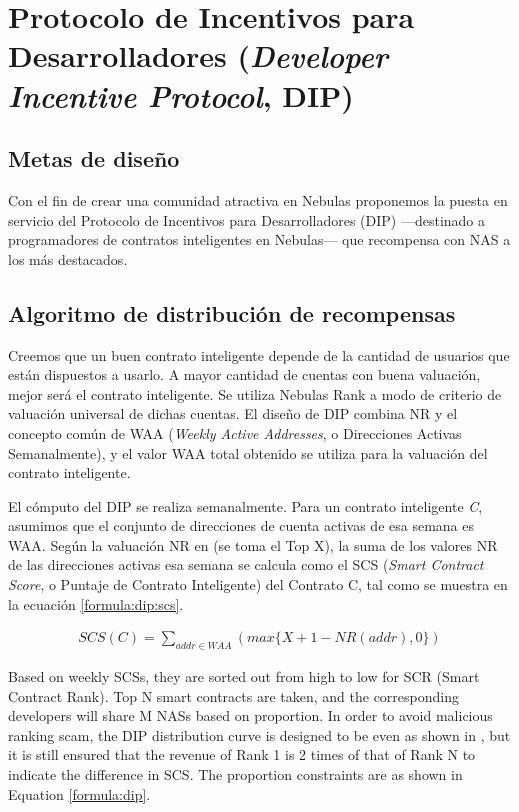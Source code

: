 \section{Protocolo de Incentivos para Desarrolladores (\textit{Developer Incentive Protocol}, DIP)}
\label{sec:dip}

\subsection{Metas de diseño}
\label{dip:design}

Con el fin de crear una comunidad atractiva en Nebulas proponemos la puesta en servicio del Protocolo de Incentivos para Desarrolladores (DIP) —destinado a programadores de contratos inteligentes en Nebulas— que recompensa con NAS a los más destacados.

\subsection{Algoritmo de distribución de recompensas}
\label{dip:arith}

Creemos que un buen contrato inteligente depende de la cantidad de usuarios que están dispuestos a usarlo. A mayor cantidad de cuentas con buena valuación, mejor será el contrato inteligente. Se utiliza Nebulas Rank a modo de criterio de valuación universal de dichas cuentas. El diseño de DIP combina NR y el concepto común de WAA (\textit{Weekly Active Addresses}, o Direcciones Activas Semanalmente), y el valor WAA total obtenido se utiliza para la valuación del contrato inteligente.

El cómputo del DIP se realiza semanalmente. Para un contrato inteligente \textit{C}, asumimos que el conjunto de direcciones de cuenta activas de esa semana es WAA. Según la valuación NR en  (se toma el Top X), la suma de los valores NR de las direcciones activas esa semana se calcula como el SCS (\textit{Smart Contract Score}, o Puntaje de Contrato Inteligente) del Contrato C, tal como se muestra en la ecuación \ref{formula:dip:scs}.

\begin{align}
\label{formula:dip:scs}
SCS(C)=\sum_{addr \in WAA}(max\{X + 1 - NR(addr), 0\})
\end{align}

Based on weekly SCSs, they are sorted out from high to low for SCR (Smart Contract Rank). Top N smart contracts are taken, and the corresponding developers will share M NASs based on proportion. In order to avoid malicious ranking scam, the DIP distribution curve is designed to be even as shown in , but it is still ensured that the revenue of Rank 1 is 2 times of that of Rank N to indicate the difference in SCS. The proportion constraints are as shown in Equation \ref{formula:dip}.

